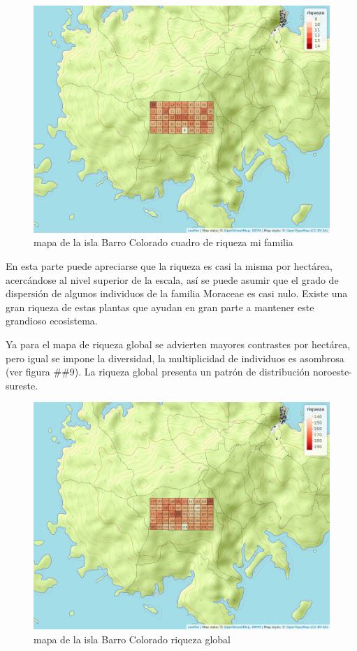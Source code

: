 \documentclass[11pt,]{article}
\begin{document}
\begin{figure}
\centering
\includegraphics[width=1.00000\textwidth]{mapa_cuadros_riq_mi_familia.png}
\caption{mapa de la isla Barro Colorado cuadro de riqueza mi familia
\label{fig:bci_map}}
\end{figure}

En esta parte puede apreciarse que la riqueza es casi la misma por
hectárea, acercándose al nivel superior de la escala, así se puede
asumir que el grado de dispersión de algunos individuos de la familia
Moraceae es casi nulo. Existe una gran riqueza de estas plantas que
ayudan en gran parte a mantener este grandioso ecosistema.

Ya para el mapa de riqueza global se advierten mayores contrastes por
hectárea, pero igual se impone la diversidad, la multiplicidad de
individuos es asombrosa (ver figura \#\#9). La riqueza global presenta
un patrón de distribución noroeste-sureste.

\begin{figure}
\centering
\includegraphics[width=1.00000\textwidth]{mapa_cuadros_riq_global.png}
\caption{mapa de la isla Barro Colorado riqueza global
\label{fig:bci_map}}
\end{figure}
\end{document}

